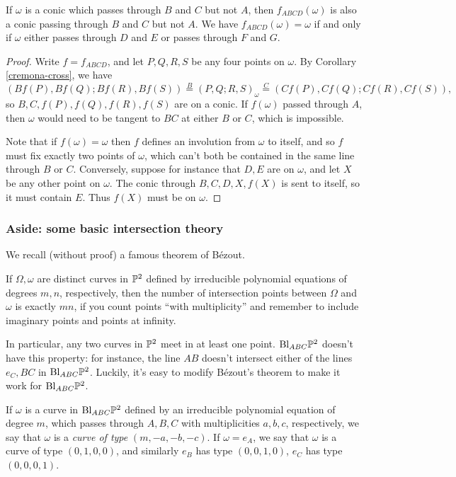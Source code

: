 \begin{thm}\label{cremona-two} If $\omega$ is a conic which passes through $B$ and $C$ but not $A$, then $f_{ABCD}(\omega)$ is also a conic passing through $B$ and $C$ but not $A$. We have $f_{ABCD}(\omega) = \omega$ if and only if $\omega$ either passes through $D$ and $E$ or passes through $F$ and $G$.
\end{thm}
\begin{proof} Write $f = f_{ABCD}$, and let $P,Q,R,S$ be any four points on $\omega$. By Corollary \ref{cremona-cross}, we have
\[
(Bf(P),Bf(Q);Bf(R),Bf(S)) \stackrel{B}{=} (P,Q;R,S)_\omega \stackrel{C}{=} (Cf(P),Cf(Q);Cf(R),Cf(S)),
\]
so $B,C,f(P),f(Q),f(R),f(S)$ are on a conic. If $f(\omega)$ passed through $A$, then $\omega$ would need to be tangent to $BC$ at either $B$ or $C$, which is impossible.

Note that if $f(\omega) = \omega$ then $f$ defines an involution from $\omega$ to itself, and so $f$ must fix exactly two points of $\omega$, which can't both be contained in the same line through $B$ or $C$. Conversely, suppose for instance that $D,E$ are on $\omega$, and let $X$ be any other point on $\omega$. The conic through $B,C,D,X,f(X)$ is sent to itself, so it must contain $E$. Thus $f(X)$ must be on $\omega$.
\end{proof}

\subsubsection{Aside: some basic intersection theory}

We recall (without proof) a famous theorem of B\'ezout.

\begin{thm}[B\'ezout] If $\Omega,\omega$ are distinct curves in $\mathbb{P}^2$ defined by irreducible polynomial equations of degrees $m,n$, respectively, then the number of intersection points between $\Omega$ and $\omega$ is exactly $mn$, if you count points ``with multiplicity'' and remember to include imaginary points and points at infinity.
\end{thm}

In particular, any two curves in $\mathbb{P}^2$ meet in at least one point. $\text{\rm Bl}_{ABC}\mathbb{P}^2$ doesn't have this property: for instance, the line $AB$ doesn't intersect either of the lines $e_C, BC$ in $\text{\rm Bl}_{ABC}\mathbb{P}^2$. Luckily, it's easy to modify B\'ezout's theorem to make it work for $\text{\rm Bl}_{ABC}\mathbb{P}^2$.

\begin{defn} If $\omega$ is a curve in $\text{\rm Bl}_{ABC}\mathbb{P}^2$ defined by an irreducible polynomial equation of degree $m$, which passes through $A,B,C$ with multiplicities $a,b,c$, respectively, we say that $\omega$ is a \emph{curve of type} $(m,-a,-b,-c)$. If $\omega = e_A$, we say that $\omega$ is a curve of type $(0,1,0,0)$, and similarly $e_B$ has type $(0,0,1,0)$, $e_C$ has type $(0,0,0,1)$.
\end{defn}

